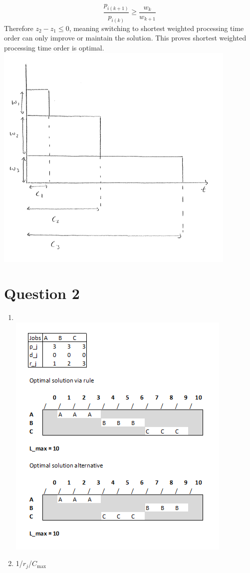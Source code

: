 \documentclass[10pt,a4paper]{article}
\begin{document}
\begin{equation*}
	\frac{p_{i(k+1)}}{p_{i(k)}} \geq \frac{w_k}{w_{k+1}}
\end{equation*}
Therefore \(z_2 - z_1 \leq 0\), meaning switching to shortest weighted processing time order can only improve or maintain the solution.  This proves shortest weighted processing time order is optimal.\\
\includegraphics[width=0.7\linewidth]{q1}
\section*{Question 2}
\begin{enumerate}
	\item \text{}\\
	\includegraphics[width=1\linewidth]{q2}

	
	\item 1/\(r_j\)/\(C_\text{max}\)
\end{enumerate}
\end{document}
